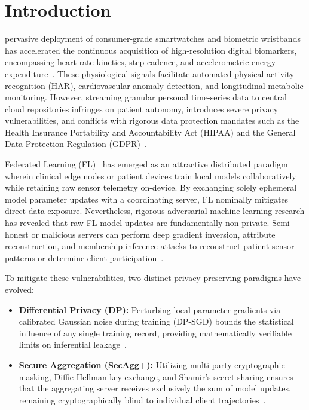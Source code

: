 \documentclass[journal,twocolumn,10pt]{IEEEtran}
\begin{document}
\section{Introduction}
 pervasive deployment of consumer-grade smartwatches and biometric wristbands has accelerated the continuous acquisition of high-resolution digital biomarkers, encompassing heart rate kinetics, step cadence, and accelerometric energy expenditure~\cite{akhmetov2025auto}. These physiological signals facilitate automated physical activity recognition (HAR), cardiovascular anomaly detection, and longitudinal metabolic monitoring. However, streaming granular personal time-series data to central cloud repositories infringes on patient autonomy, introduces severe privacy vulnerabilities, and conflicts with rigorous data protection mandates such as the Health Insurance Portability and Accountability Act (HIPAA) and the General Data Protection Regulation (GDPR)~\cite{rieke2020future, kaissis2020secure}.

Federated Learning (FL)~\cite{mcmahan2017communication} has emerged as an attractive distributed paradigm wherein clinical edge nodes or patient devices train local models collaboratively while retaining raw sensor telemetry on-device. By exchanging solely ephemeral model parameter updates with a coordinating server, FL nominally mitigates direct data exposure. Nevertheless, rigorous adversarial machine learning research has revealed that raw FL model updates are fundamentally non-private. Semi-honest or malicious servers can perform deep gradient inversion, attribute reconstruction, and membership inference attacks to reconstruct patient sensor patterns or determine client participation~\cite{abadi2016deep, kairouz2021advances}.

To mitigate these vulnerabilities, two distinct privacy-preserving paradigms have evolved:
\begin{itemize}
    \item \textbf{Differential Privacy (DP):} Perturbing local parameter gradients via calibrated Gaussian noise during training (DP-SGD) bounds the statistical influence of any single training record, providing mathematically verifiable limits on inferential leakage~\cite{abadi2016deep, dwork2014algorithmic}.
    \item \textbf{Secure Aggregation (SecAgg+):} Utilizing multi-party cryptographic masking, Diffie-Hellman key exchange, and Shamir's secret sharing ensures that the aggregating server receives exclusively the sum of model updates, remaining cryptographically blind to individual client trajectories~\cite{bonawitz2017practical, bell2020secaggplus}.
\end{itemize}
\end{document}
